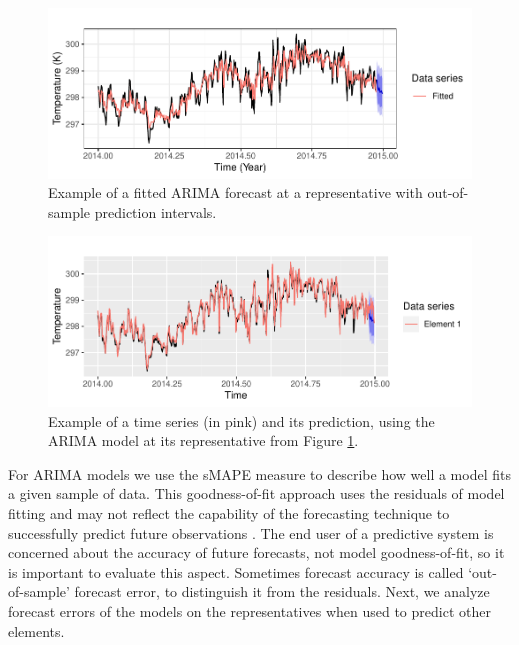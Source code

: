 \begin{figure}[h!]
	\centering
	\includegraphics[scale=1]{../Figures/medoid_forecast_fitted}
	\caption{Example of a fitted ARIMA forecast at a representative with out-of-sample prediction intervals.}
	\label{Fig:ModelFinalToForecast}
\end{figure}

\begin{figure}[h!]
	\centering
	\includegraphics[scale=1]{../Figures/forecast_element1}
	\caption{Example of a time series (in pink) and its prediction, using the ARIMA model at its representative from Figure \ref{Fig:ModelFinalToForecast}.}
	\label{Fig:ForecastElement1}
\end{figure}

For ARIMA models we use the sMAPE measure to describe how well a model fits a given sample of data. This goodness-of-fit approach uses the residuals of model fitting and may not reflect the capability of the forecasting technique to successfully predict future observations \cite{Montgomery2015}. The end user of a predictive system is concerned about the accuracy of future forecasts, not model goodness-of-fit, so it is important to evaluate this aspect. Sometimes forecast accuracy is called `out-of-sample' forecast error, to distinguish it from the residuals. Next, we analyze forecast errors of the models on the representatives when used to predict other elements.

